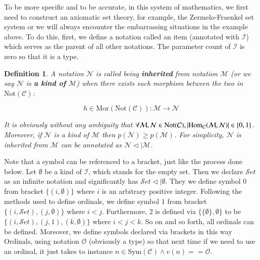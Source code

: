 \documentclass{aims}
\numberwithin{equation}{section}
\newtheorem{definition}{Definition}	%
\numberwithin{theorem}{section}	%
\numberwithin{axiom}{section}	%
\numberwithin{definition}{section}	%
\begin{document}
	To be more specific and to be accurate, in this system of mathematics, we first need to construct an axiomatic set theory, for example, the Zermelo-Fraenkel set system or we will always encounter the embarrassing situations in the example above. To do this, first, we define a notation called an item (annotated with \(\mathcal{I}\)) which serves as the parent of all other notations. The parameter count of \(\mathcal{I}\) is zero so that it is a type.
	
	\begin{definition}
		A notation \(\mathcal{N}\) is called being \textbf{ inherited} from notation \(\mathcal{M}\) (or we say \(\mathcal{N}\) is\textbf{  a kind of} \(\mathcal{M}\)) when there exists such morphism between the two in \(\text{Not}(\mathcal{C})\):
		
		\begin{equation}
			h\in \text{Mor}(\text{Not}(\mathcal{C})): \mathcal{M}\to \mathcal{N}
		\end{equation}
		
		It is obviously without any ambiguity that \(\forall \mathcal{M},\mathcal{N}\in \text{Not}(\mathcal{C}),\left|\text{Hom}_{\mathcal{C}}(\mathcal{M},\mathcal{N})\right|$ $\in \{0,1\}\). Moreover, if \(\mathcal{N}\) is a kind of \(\mathcal{M}\) then \(\mathit{p}(\mathcal{N})\geq \mathit{p}(\mathcal{M})\). For simplicity, \(\mathcal{N}\) is inherited from \(\mathcal{M}\) can be annotated as \(\mathcal{N}\triangleleft |\mathcal{M}\).
	\end{definition}
	
	Note that a symbol can be referenced to a bracket, just like the process done below. Let \(\emptyset\) be a kind of \(\mathcal{I}\), which stands for the empty set. Then we declare \(\mathcal{S}\mathit{e}\mathit{t}\) as an infinite notation and significantly has \(\mathcal{S}\mathit{e}\mathit{t}\triangleleft |\emptyset\). They we define symbol \(0\) from bracket \(\{(i,\emptyset )\}\) where \(i\) is an arbitrary positive integer. Following the methods used to define ordinals, we define symbol \(1\) from bracket \(\{(i,\mathcal{S}\mathit{e}\mathit{t}),(j,\emptyset )\}\) where \(i<j\). Furthermore, 2 is defined via \(\{\{\emptyset \},\emptyset \}\) to be \(\{(i,\mathcal{S}\mathit{e}\mathit{t}),(j,1),(k,\emptyset )\}\) where \(i<j<k\). So on and so forth, all ordinals can be defined. Moreover, we define symbols declared via brackets in this way \(\text{Ordinals}\), using notation \(\mathcal{O}\) (obviously a type) so that next time if we need to use an ordinal, it just takes to instance \(n\in \text{Sym}(\mathcal{C})\land \mathit{v}(n)==\mathcal{O}\).
	
\end{document}
